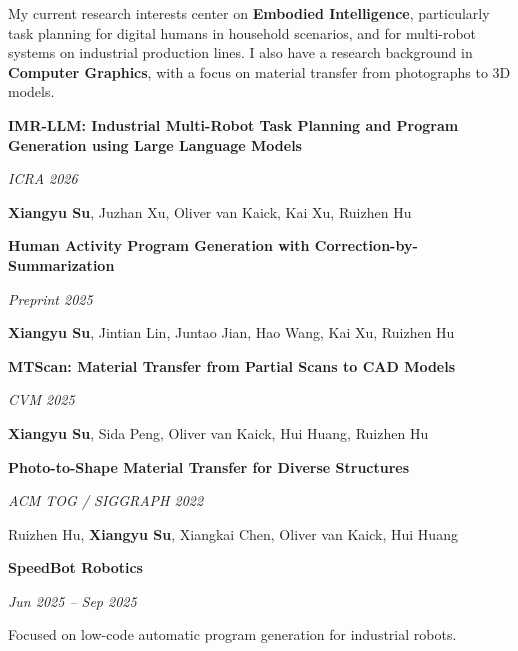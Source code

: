 \documentclass[10pt,a4paper,UTF8]{altacv}
\newcommand{\pub}[3]{%
  \begin{minipage}[t]{0.72\linewidth}\raggedright\textbf{#1}\end{minipage}\hfill\begin{minipage}[t]{0.27\linewidth}\raggedleft\textit{#3}\end{minipage}\par
  \vspace{5pt}
  {\color{authorgrey}#2}\par\vspace{10pt}
}
\newcommand{\role}[3]{%
  \begin{minipage}[t]{0.72\linewidth}\raggedright\textbf{#1}\end{minipage}\hfill\begin{minipage}[t]{0.27\linewidth}\raggedleft\textit{#2}\end{minipage}\par
  \vspace{5pt}
  {#3}\par\vspace{10pt}
}
\begin{document}

\begin{fullwidth}
\makecvheader
\end{fullwidth}



{\justifying My current research interests center on \textbf{Embodied Intelligence}, particularly task planning for digital humans in household scenarios, and for multi-robot systems on industrial production lines. I also have a research background in \textbf{Computer Graphics}, with a focus on material transfer from photographs to 3D models.\par}

\vspace{12pt}


\pub
  {IMR-LLM: Industrial Multi-Robot Task Planning and Program Generation using Large Language Models}
  {\textbf{Xiangyu Su}, Juzhan Xu, Oliver van Kaick, Kai Xu, Ruizhen Hu}
  {ICRA 2026}

\pub
  {Human Activity Program Generation with Correction-by-Summarization}
  {\textbf{Xiangyu Su}, Jintian Lin, Juntao Jian, Hao Wang, Kai Xu, Ruizhen Hu}
  {Preprint 2025}

\pub
  {MTScan: Material Transfer from Partial Scans to CAD Models}
  {\textbf{Xiangyu Su}, Sida Peng, Oliver van Kaick, Hui Huang, Ruizhen Hu}
  {CVM 2025}

\pub
  {Photo-to-Shape Material Transfer for Diverse Structures}
  {Ruizhen Hu, \textbf{Xiangyu Su}, Xiangkai Chen, Oliver van Kaick, Hui Huang}
  {ACM TOG / SIGGRAPH 2022}



\role
  {SpeedBot Robotics}
  {Jun 2025 -- Sep 2025}
  {Focused on low-code automatic program generation for industrial robots.}
\end{document}

